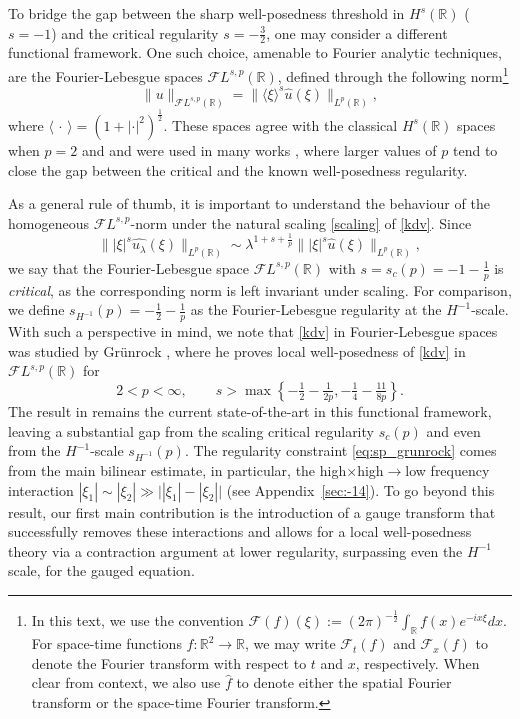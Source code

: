 \documentclass[a4paper,
11pt,  reqno]{amsart}
\newcommand{\5}{\textup{V}}
\newcommand{\FL}{\mathcal{F} L}
\newcommand{\ft}{\widehat}
\theoremstyle{remark}
\newcommand{\R}{\mathbb{R}}
\newcommand{\ld}{\lambda}
\newcommand{\Ft}{{\mathcal{F}}}
\newcommand{\jb}[1]
{\langle #1 \rangle}
\numberwithin{equation}{section}
\numberwithin{theorem}{section}
\begin{document}
To bridge the gap between the sharp well-posedness threshold in $H^s(\R)$ ($s=-1$) and the critical regularity $s=-\frac32$, one may consider a different functional framework.
One such choice, amenable to Fourier analytic techniques, are the Fourier-Lebesgue spaces $\FL^{s,p}(\R)$, defined through the following norm\footnote{
In this text, we use the convention
$
 \Ft(f)(\xi) := (2\pi)^{-\frac12} \int_\R f(x) e^{-i x \xi} dx.
$
For space-time functions $f: \R^2 \to \R$, we may write $\Ft_t (f)$ and $\Ft_x(f)$ to denote the Fourier transform with respect to $t$ and $x$, respectively. When clear from context, we also use $\ft{f}$ to denote either the spatial Fourier transform or the space-time Fourier transform. }
	\begin{equation}
		\|u \|_{\FL^{s,p}(\R)}=\|\jb{\xi}^{s}\ft{u  }(\xi)\|_{L^p(\R)},
	\end{equation}
    where $\jb{\,\cdot\,} = (1+|\cdot|^2)^\frac12$.
These spaces agree with the classical $H^s(\R)$ spaces when $p=2$ and
and were used in many works \cite{adams, BO94, Chapouto_FL_mkdv, Christ_power,CC24,Grunrock_mkdv, Grunrock_ldv_hier, HerrGrunrock_FL,  GrunrockVega}, where larger values of $p$ tend to close the gap between the critical and the known well-posedness regularity.





As a general rule of thumb, it is important to understand the behaviour of the homogeneous ${\FL}^{s,p}$-norm under the natural scaling \eqref{scaling} of \eqref{kdv}.
Since
$$
\big\| |\xi|^s  \ft{u_\ld}(\xi) \big\|_{L^p(\R)} \sim \lambda^{1+s+\frac1p}
\big\| |\xi|^s \ft{u} (\xi) \big\|_{L^p(\R)},
$$
we say that the Fourier-Lebesgue space $\FL^{s,p}(\R)$ with
$s=s_c(p)=-1-\frac1p$ is \emph{critical}, as the corresponding norm is left invariant under scaling. For comparison, we define $s_{H^{-1}}(p) = - \frac12 - \frac1p$ as the Fourier-Lebesgue regularity at the $H^{-1}$-scale.
 With such a perspective in mind, we note that \eqref{kdv} in Fourier-Lebesgue spaces was studied by Gr\"unrock \cite{Grunrock_ldv_hier},  where he proves local well-posedness of \eqref{kdv} in $\mathcal{F}L^{s,p}(\R)$ for
	\begin{equation}
		2<p<\infty,\qquad s>\max\left\{ -\tfrac12 - \tfrac{1}{2p}, -\tfrac14 - \tfrac{11}{8p} \right\}.
\label{eq:sp_grunrock}
	\end{equation}
The result in \cite{Grunrock_ldv_hier} remains the current state-of-the-art in this functional framework, leaving a substantial gap from the scaling critical regularity $s_c(p)$ and even from the $H^{-1}$-scale $s_{H^{-1}}(p)$. The regularity constraint \eqref{eq:sp_grunrock} comes from the main bilinear estimate, in particular, the high$\times$high$\to$low frequency interaction $|\xi_1| \sim |\xi_2| \gg \big||\xi_1| - |\xi_2|\big|$ (see Appendix~\ref{sec:-14}).
To go beyond this result, our first main contribution is the introduction of a gauge transform that
successfully removes these interactions and allows for a local well-posedness theory via a contraction argument at lower regularity, surpassing even the $H^{-1}$ scale, for the gauged equation.
\end{document}
